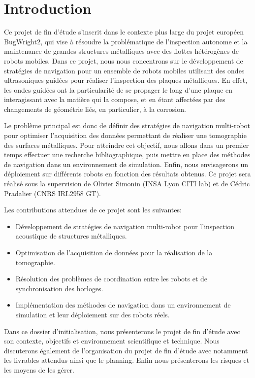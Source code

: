 \documentclass[init,francais,RandD]{rapportPFE}  %
\begin{document}
	\section{Introduction}
		Ce projet de fin d'étude s'inscrit dans le contexte plus large du projet européen BugWright2, qui vise à résoudre la problématique de l'inspection autonome et la maintenance de grandes structures métalliques avec des flottes hétérogènes de robots mobiles. Dans ce projet, nous nous concentrons sur le développement de stratégies de navigation pour un ensemble de robots mobiles utilisant des ondes ultrasoniques guidées pour réaliser l'inspection des plaques métalliques. En effet, les ondes guidées ont la particularité de se propager le long d'une plaque en interagissant avec la matière qui la compose, et en étant affectées par des changements de géométrie liés, en particulier, à la corrosion.

		Le problème principal est donc de définir des stratégies de navigation multi-robot pour optimiser l'acquisition des données permettant de réaliser une tomographie des surfaces métalliques. Pour atteindre cet objectif, nous allons dans un premier temps effectuer une recherche bibliographique, puis mettre en place des méthodes de navigation dans un environnement de simulation. Enfin, nous envisagerons un déploiement sur différents robots en fonction des résultats obtenus. Ce projet sera réalisé sous la supervision de Olivier Simonin (INSA Lyon CITI lab) et de Cédric Pradalier (CNRS IRL2958 GT).

		Les contributions attendues de ce projet sont les suivantes:
		\begin{itemize}
			\item Développement de stratégies de navigation multi-robot pour l'inspection acoustique de structures métalliques.
			\item Optimisation de l'acquisition de données pour la réalisation de la tomographie.
			\item Résolution des problèmes de coordination entre les robots et de synchronisation des horloges.
			\item Implémentation des méthodes de navigation dans un environnement de simulation et leur déploiement sur des robots réels.
		\end{itemize}

		Dans ce dossier d'initialisation, nous présenterons le projet de fin d'étude avec son contexte, objectifs et environnement scientifique et technique. Nous discuterons également de l'organisation du projet de fin d'étude avec notamment les livrables attendus ainsi que le planning. Enfin nous présenterons les risques et les moyens de les gérer.
\end{document}
